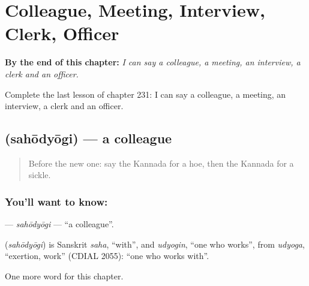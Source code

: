 
\chapter{Colleague, Meeting, Interview, Clerk, Officer}
\label{ch:ka-colleague-meeting-interview-clerk-officer}

\begin{chapteropening}
\textbf{By the end of this chapter:} \emph{I can say a colleague, a meeting, an interview, a clerk and an officer.}

Complete the last lesson of chapter 231: I can say a colleague, a meeting, an interview, a clerk and an officer.
\end{chapteropening}

\section[\texorpdfstring{\kn{ಸಹೋದ್ಯೋಗಿ} (sahōdyōgi)}{ಸಹೋದ್ಯೋಗಿ (sahōdyōgi)}]{ (sahōdyōgi) — a colleague}

\label{lesson:KA-C231-sahodyogi}



\begin{quote}
Before the new one: say the Kannada for a hoe, then the Kannada for a sickle.
\end{quote}

\subsection*{You'll want to know: }
\textbf{} — \emph{sahōdyōgi} — \textquotedblleft{}a colleague\textquotedblright{}.

\begin{cousinweb}
\textbf{} (\emph{sahōdyōgi}) is Sanskrit \emph{saha}, \textquotedblleft{}with\textquotedblright{}, and \emph{udyogin}, \textquotedblleft{}one who works\textquotedblright{}, from \emph{udyoga}, \textquotedblleft{}exertion, work\textquotedblright{} (CDIAL 2055): \textquotedblleft{}one who works with\textquotedblright{}.
\end{cousinweb}

\begin{grammarlens}[title={What you've built}]
One more word for this chapter.
\end{grammarlens}

